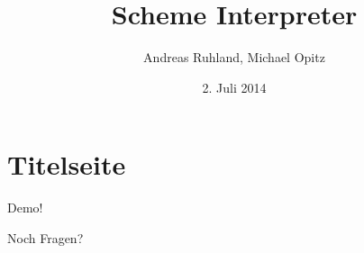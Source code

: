 \documentclass[t]{beamer}
\title[Scheme Interpreter]{Scheme Interpreter}
\author[A. Ruhland, M. Opitz]{
    Andreas Ruhland, Michael Opitz
}
\institute[TUM]{Technische Universität München}
\date[2.07.2014]{2. Juli 2014}
\begin{document}
\section{Titelseite}
\frame{\titlepage}







\begin{frame}[c]
    \begin{center}
        Demo!\par
    \end{center}
\end{frame}

\begin{frame}[c]
    \begin{center}
        Noch Fragen?\par
    \end{center}
\end{frame}

%
%
\end{document}
